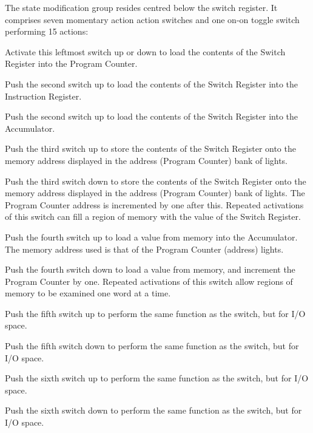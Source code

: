 The state modification group resides centred below the switch
register. It comprises seven momentary action action switches and one
on-on toggle switch performing 15 actions:

\begin{description}
\item{\bfseries{}} Activate this leftmost switch up or down to load the
  contents of the Switch Register into the Program Counter.
\item{\bfseries{}} Push the second switch up to load the contents
  of the Switch Register into the Instruction Register.
\item{\bfseries{}} Push the second switch up to load the contents
  of the Switch Register into the \gls{Accumulator}.
\item{\bfseries{}} Push the third switch up to store the
  contents of the Switch Register onto the memory address displayed in
  the address (Program Counter) bank of lights.
\item{\bfseries{}} Push the third switch down to store the
  contents of the Switch Register onto the memory address displayed in
  the address (Program Counter) bank of lights. The Program Counter
  address is incremented by one after this. Repeated activations of
  this switch can fill a region of memory with the value of the Switch
  Register.
\item{\bfseries{}} Push the fourth switch up to load a
  value from memory into the \gls{Accumulator}. The memory address used is
  that of the Program Counter (address) lights.
\item{\bfseries{}} Push the fourth switch down to load a
  value from memory, and increment the Program Counter by
  one. Repeated activations of this switch allow regions of memory to
  be examined one word at a time.
\item{\bfseries{}} Push the fifth switch up to
  perform the same function as the  switch, but for
  I/O space.
\item{\bfseries{}} Push the fifth switch down to
  perform the same function as the  switch, but
  for I/O space.
\item{\bfseries{}} Push the sixth switch up to
  perform the same function as the  switch, but for
  I/O space.
\item{\bfseries{}} Push the sixth switch down to
  perform the same function as the  switch, but
  for I/O space.


\end{description}
